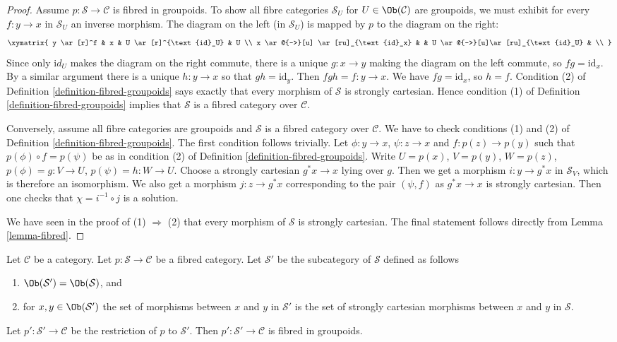 \begin{proof}
Assume $p : \mathcal{S} \to \mathcal{C}$ is fibred in groupoids.
To show all fibre categories $\mathcal{S}_U$ for
$U \in \Ob(\mathcal{C})$
are groupoids, we must exhibit for every $f : y \to x$ in $\mathcal{S}_U$ an
inverse morphism.  The diagram on the left (in $\mathcal{S}_U$) is mapped by
$p$ to the diagram on the right:
$$
\xymatrix{
y \ar[r]^f & x & U \ar[r]^{\text{id}_U} & U \\
x \ar@{-->}[u] \ar[ru]_{\text{id}_x} & &
U \ar@{-->}[u]\ar[ru]_{\text{id}_U} & \\
}
$$
Since only $\text{i}d_U$ makes the diagram on the right commute, there is a
unique $g : x \to y$ making the diagram on the left commute, so
$fg = \text{id}_x$. By a similar argument there is a unique $h : y \to x$ so
that $gh = \text{id}_y$. Then $fgh = f : y \to x$.  We have $fg = \text{id}_x$,
so $h = f$. Condition (2) of Definition \ref{definition-fibred-groupoids} says
exactly that every morphism of $\mathcal{S}$ is strongly cartesian. Hence
condition (1) of Definition \ref{definition-fibred-groupoids} implies that
$\mathcal{S}$ is a fibred category over $\mathcal{C}$.

\medskip\noindent
Conversely, assume all fibre categories are groupoids and
$\mathcal{S}$ is a fibred category over $\mathcal{C}$.
We have to check conditions (1) and (2) of
Definition \ref{definition-fibred-groupoids}.
The first condition follows trivially. Let $\phi : y \to x$,
$\psi : z \to x$ and $f : p(z) \to p(y)$ such that
$p(\phi) \circ f = p(\psi)$ be as in condition (2) of
Definition \ref{definition-fibred-groupoids}.
Write $U = p(x)$, $V = p(y)$, $W = p(z)$, $p(\phi) = g : V \to U$,
$p(\psi) = h : W \to U$. Choose a strongly cartesian $g^*x \to x$
lying over $g$. Then we get a morphism $i : y \to g^*x$ in
$\mathcal{S}_V$, which is therefore an isomorphism. We
also get a morphism $j : z \to g^*x$ corresponding to
the pair $(\psi, f)$ as $g^*x \to x$ is strongly cartesian.
Then one checks that $\chi = i^{-1} \circ j$ is a solution.

\medskip\noindent
We have seen in the proof of (1) $\Rightarrow$ (2) that
every morphism of $\mathcal{S}$ is strongly cartesian.
The final statement follows directly from Lemma \ref{lemma-fibred}.
\end{proof}

\begin{lemma}
\label{lemma-fibred-gives-fibred-groupoids}
Let $\mathcal{C}$ be a category.
Let $p : \mathcal{S} \to \mathcal{C}$ be a fibred category.
Let $\mathcal{S}'$ be the subcategory of $\mathcal{S}$ defined
as follows
\begin{enumerate}
\item $\Ob(\mathcal{S}') = \Ob(\mathcal{S})$, and
\item for $x, y \in \Ob(\mathcal{S}')$ the set of morphisms between $x$
and $y$ in $\mathcal{S}'$ is the set of strongly cartesian morphisms between
$x$ and $y$ in $\mathcal{S}$.
\end{enumerate}
Let $p' : \mathcal{S}' \to \mathcal{C}$ be the restriction of $p$
to $\mathcal{S}'$. Then $p' : \mathcal{S}' \to \mathcal{C}$ is fibred
in groupoids.
\end{lemma}

